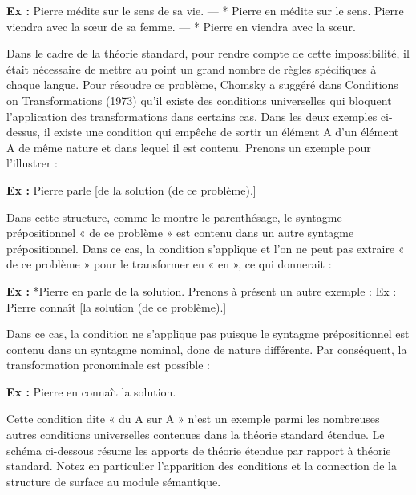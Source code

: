 \noindent\textbf{Ex :} Pierre médite sur le sens de sa vie. — * Pierre en médite sur le sens. Pierre viendra avec la sœur de sa femme. — * Pierre en viendra avec la sœur.\par

Dans le cadre de la théorie standard, pour rendre compte de cette impossibilité, il était nécessaire de mettre au point un grand nombre de règles spécifiques à chaque langue. Pour résoudre ce problème, Chomsky a suggéré dans Conditions on Transformations (1973) qu’il existe des conditions universelles qui bloquent l’application des transformations dans certains cas. Dans les deux exemples ci-dessus, il existe une condition qui empêche de sortir un élément A d’un élément A de même nature et dans lequel il est contenu. Prenons un exemple pour l’illustrer :\par

\noindent\textbf{Ex :} Pierre parle [de la solution (de ce problème).]\par

Dans cette structure, comme le montre le parenthésage, le syntagme prépositionnel « de ce problème » est contenu dans un autre syntagme prépositionnel. Dans ce cas, la condition s’applique et l’on ne peut pas extraire « de ce problème » pour le transformer en « en », ce qui donnerait :\par




\noindent\textbf{Ex :} *Pierre en parle de la solution. Prenons à présent un autre exemple : Ex : Pierre connaît [la solution (de ce problème).]\par

Dans ce cas, la condition ne s’applique pas puisque le syntagme prépositionnel est contenu dans un syntagme nominal, donc de nature différente. Par conséquent, la transformation pronominale est possible :\par

\noindent\textbf{Ex :} Pierre en connaît la solution.\par

Cette condition dite « du A sur A » n’est un exemple parmi les nombreuses autres conditions universelles contenues dans la théorie standard étendue. Le schéma ci-dessous résume les apports de théorie étendue par rapport à théorie standard. Notez en particulier l’apparition des conditions et la connection de la structure de surface au module sémantique.\par

